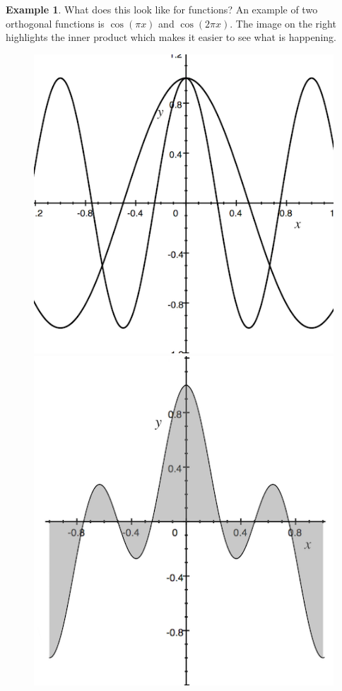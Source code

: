 \documentclass{article}
\theoremstyle{definition}
\theoremstyle{definition}
\newtheorem{example}{Example}
\begin{document}
\begin{example}
    What does this look like for functions? An example of two orthogonal functions is $\cos(\pi x)$ and $\cos(2\pi x)$. The image on the right highlights the inner product which makes it easier to see what is happening.

    \begin{figure}[h]
        \includegraphics[scale=0.3]{ortho}
        \includegraphics[scale=0.3]{ortho-int}
        \centering
    \end{figure}
\end{example}
\end{document}
